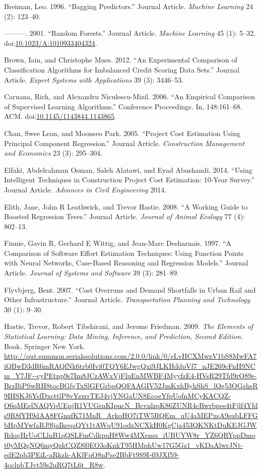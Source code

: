\documentclass[]{elsarticle} %
\begin{document}
\hypertarget{ref-Breiman1996}{}
Breiman, Leo. 1996. ``Bagging Predictors.'' Journal Article.
\emph{Machine Learning} 24 (2): 123--40.

\hypertarget{ref-Breiman2001a}{}
---------. 2001. ``Random Forests.'' Journal Article. \emph{Machine
Learning} 45 (1): 5--32.
doi:\href{https://doi.org/10.1023/A:1010933404324}{10.1023/A:1010933404324}.

\hypertarget{ref-Brown2012}{}
Brown, Iain, and Christophe Mues. 2012. ``An Experimental Comparison of
Classification Algorithms for Imbalanced Credit Scoring Data Sets.''
Journal Article. \emph{Expert Systems with Applications} 39 (3):
3446--53.

\hypertarget{ref-Caruana2006}{}
Caruana, Rich, and Alexandru Niculescu-Mizil. 2006. ``An Empirical
Comparison of Supervised Learning Algorithms.'' Conference Proceedings.
In, 148:161--68. ACM.
doi:\href{https://doi.org/10.1145/1143844.1143865}{10.1145/1143844.1143865}.

\hypertarget{ref-Chan2005}{}
Chan, Swee Lean, and Moonseo Park. 2005. ``Project Cost Estimation Using
Principal Component Regression.'' Journal Article. \emph{Construction
Management and Economics} 23 (3): 295--304.

\hypertarget{ref-Elfaki2014}{}
Elfaki, Abdelrahman Osman, Saleh Alatawi, and Eyad Abushandi. 2014.
``Using Intelligent Techniques in Construction Project Cost Estimation:
10-Year Survey.'' Journal Article. \emph{Advances in Civil Engineering}
2014.

\hypertarget{ref-Elith2008}{}
Elith, Jane, John R Leathwick, and Trevor Hastie. 2008. ``A Working
Guide to Boosted Regression Trees.'' Journal Article. \emph{Journal of
Animal Ecology} 77 (4): 802--13.

\hypertarget{ref-Finnie1997}{}
Finnie, Gavin R, Gerhard E Wittig, and Jean-Marc Desharnais. 1997. ``A
Comparison of Software Effort Estimation Techniques: Using Function
Points with Neural Networks, Case-Based Reasoning and Regression
Models.'' Journal Article. \emph{Journal of Systems and Software} 39
(3): 281--89.

\hypertarget{ref-Flyvbjerg2007}{}
Flyvbjerg, Bent. 2007. ``Cost Overruns and Demand Shortfalls in Urban
Rail and Other Infrastructure.'' Journal Article. \emph{Transportation
Planning and Technology} 30 (1): 9--30.

\hypertarget{ref-Hastie2009}{}
Hastie, Trevor, Robert Tibshirani, and Jerome Friedman. 2009. \emph{The
Elements of Statistical Learning: Data Mining, Inference, and
Prediction, Second Edition}. Book. Springer New York.
\url{http://qut.summon.serialssolutions.com/2.0.0/link/0/eLvHCXMwzV1bS8MwFA7iQBwD3dR6mRAQfNk6trb0Ivi0TQY6EJwgQxi9JLKHddpVf7_nJE269cFnH9NCm_Y7JF--cyPEtnp9s7Im8JCzAWxVjFluEnMWBF4MyyfzE4-HVsR29Tfd9rO89s-BrzBiPSwRH8tocBGfgTxSlGFGrbpQQFAAGIV52JmKxhByhShS_lQg53OGzhsR9IHSKJ6YsfDxcttlP8vYzzrrTEJ4vjYNGaUN8EcoeYfpUofnMCyKACQZ-O6qMEelNAQVpUEpjR1VUGrnKIpucN_BcvnlzqK86ZUNR4cBwrbpes4tFjlf4Yfds9R8fYH9dAA8FGnufK71MnR_ArkqHO7iTW5RQEm_uU4aMEPxsA9subLFFGbHpMYwfaRJ9ljaIkeqaQYt1tAWqU91odzNCXkH0KgCja453QKNKtDuKEJGJWRdqgHrUoCLlnB1qQSLFmCdkpuH8Ww4MXemu_iUBUYW8r_YZ6QRYppDmot0yMQgNQ6myQzkCQZ8l0EO3oKnkT95HMphUw17G5Gz1_vKDaAlwrJNt-edE2pb3PEiL-aRkzh-AKfFqO8nPse2BbFt9S9I-69JXf59-4oclpbTJvt59s2uRQ7tL6t_R8w}.
\end{document}
